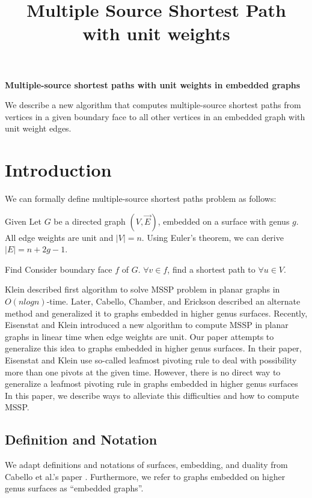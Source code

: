 \documentclass{article}
\begin{document}
\title{Multiple Source Shortest Path with unit weights}

\begin{center}
\textbf{\large Multiple-source shortest paths with unit weights in embedded
graphs}
\end{center}

\DRAFT

\begin{bigabstract}
We describe a new algorithm that computes multiple-source shortest paths from
vertices in a given boundary face to all other vertices in an embedded graph
with unit weight edges.
\end{bigabstract}

\section{Introduction}

We can formally define multiple-source shortest paths problem as follows: 

\begin{oneshot}{Given}
Let $G$ be a directed graph $(V, \vec{E})$, embedded on a surface with genus $g$.
All edge weights are unit and $|V| = n$. Using Euler's theorem, we can derive 
$|E| = n + 2g - 1$.
\end{oneshot}

\begin{oneshot}{Find}
Consider boundary face $f$ of $G$. $\forall v \in f$, find a shortest path to
$\forall u \in V$.
\end{oneshot}

Klein \cite{klein2005multiple} described first algorithm to solve MSSP problem in planar graphs in $O(n logn)$-time. Later, Cabello, Chamber, and Erickson \cite{cabello2013multiple} described an alternate method and generalized it to graphs embedded in higher genus surfaces. 
Recently, Eisenstat and Klein \cite{eisenstat2013linear} introduced a new algorithm to compute MSSP in planar graphs in linear time when edge weights are unit. Our 
paper attempts to generalize this idea to graphs embedded in higher genus surfaces. In their paper, Eisenstat and Klein use so-called leafmost pivoting rule to deal with possibility more than one pivots at the given time. However, there is no direct way 
to generalize a leafmost pivoting rule in graphs embedded in higher genus surfaces 
In this paper, we describe ways to alleviate this difficulties and how to compute MSSP. 

\subsection{Definition and Notation}
We adapt definitions and notations of surfaces, embedding, and duality from Cabello et al.'s paper \cite{cabello2013multiple}. Furthermore, we refer to graphs embedded on higher genus surfaces as ``embedded graphs''.
\end{document}
